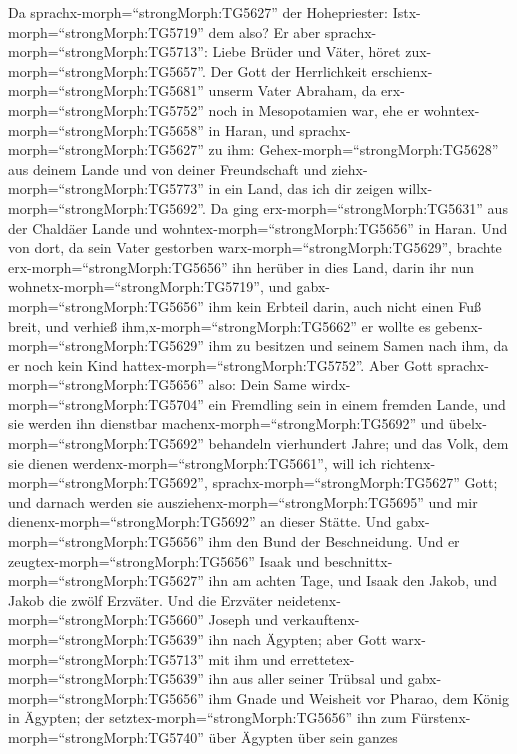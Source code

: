  Da sprachx-morph=``strongMorph:TG5627'' der Hohepriester:
Istx-morph=``strongMorph:TG5719'' dem also?  Er aber
sprachx-morph=``strongMorph:TG5713'': Liebe Brüder und Väter, höret
zux-morph=``strongMorph:TG5657''. Der Gott der Herrlichkeit
erschienx-morph=``strongMorph:TG5681'' unserm Vater Abraham, da
erx-morph=``strongMorph:TG5752'' noch in Mesopotamien war, ehe er
wohntex-morph=``strongMorph:TG5658'' in Haran,  und
sprachx-morph=``strongMorph:TG5627'' zu ihm:
Gehex-morph=``strongMorph:TG5628'' aus deinem Lande und von deiner
Freundschaft und ziehx-morph=``strongMorph:TG5773'' in ein Land, das ich
dir zeigen willx-morph=``strongMorph:TG5692''.  Da ging
erx-morph=``strongMorph:TG5631'' aus der Chaldäer Lande und
wohntex-morph=``strongMorph:TG5656'' in Haran. Und von dort, da sein
Vater gestorben warx-morph=``strongMorph:TG5629'', brachte
erx-morph=``strongMorph:TG5656'' ihn herüber in dies Land, darin ihr nun
wohnetx-morph=``strongMorph:TG5719'',  und
gabx-morph=``strongMorph:TG5656'' ihm kein Erbteil darin, auch nicht
einen Fuß breit, und verhieß ihm,x-morph=``strongMorph:TG5662'' er
wollte es gebenx-morph=``strongMorph:TG5629'' ihm zu besitzen und seinem
Samen nach ihm, da er noch kein Kind
hattex-morph=``strongMorph:TG5752''.  Aber Gott
sprachx-morph=``strongMorph:TG5656'' also: Dein Same
wirdx-morph=``strongMorph:TG5704'' ein Fremdling sein in einem fremden
Lande, und sie werden ihn dienstbar machenx-morph=``strongMorph:TG5692''
und übelx-morph=``strongMorph:TG5692'' behandeln vierhundert Jahre;
 und das Volk, dem sie dienen
werdenx-morph=``strongMorph:TG5661'', will ich
richtenx-morph=``strongMorph:TG5692'',
sprachx-morph=``strongMorph:TG5627'' Gott; und darnach werden sie
ausziehenx-morph=``strongMorph:TG5695'' und mir
dienenx-morph=``strongMorph:TG5692'' an dieser Stätte.  Und
gabx-morph=``strongMorph:TG5656'' ihm den Bund der Beschneidung. Und er
zeugtex-morph=``strongMorph:TG5656'' Isaak und
beschnittx-morph=``strongMorph:TG5627'' ihn am achten Tage, und Isaak
den Jakob, und Jakob die zwölf Erzväter.  Und die Erzväter
neidetenx-morph=``strongMorph:TG5660'' Joseph und
verkauftenx-morph=``strongMorph:TG5639'' ihn nach Ägypten; aber Gott
warx-morph=``strongMorph:TG5713'' mit ihm  und
errettetex-morph=``strongMorph:TG5639'' ihn aus aller seiner Trübsal und
gabx-morph=``strongMorph:TG5656'' ihm Gnade und Weisheit vor Pharao, dem
König in Ägypten; der setztex-morph=``strongMorph:TG5656'' ihn zum
Fürstenx-morph=``strongMorph:TG5740'' über Ägypten über sein ganzes
